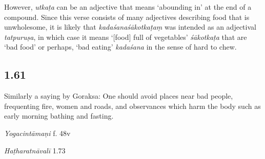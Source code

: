 \begin{ekdosis}
\begin{philcomm}[hp01_060]
However, \emph{utkaṭa} can be an adjective that means ‘abounding in’ at the end of a compound. Since this verse consists of many adjectives describing food that is unwholesome, it is likely that \emph{kadaśanaśākotkaṭaṃ} was intended as an adjectival \emph{tatpuruṣa}, in which case it means ‘[food] full of vegetables' \emph{śākotkaṭa} that are `bad food' or perhaps, `bad eating' \emph{kadaśana} in the sense of hard to chew. 
\end{philcomm}

\subsection*{1.61}
\begin{translation}[hp01_061]
Similarly a saying by Goraksa:
One should avoid places near bad people, frequenting fire, women and roads, and observances which harm the body such as early morning bathing and fasting.
\end{translation}




\begin{testimonia}[hp01_061]
\emph{Yogacintāmaṇi} f. 48v

\begin{versinnote}
\end{versinnote}

\emph{Haṭharatnāvalī} 1.73 

\begin{versinnote}
\tl{\var{°prīti°] °prāntaṃ P, prāptaṃ T,t1. kāyakleśādikaṃ ] kāyakleśavidhiṃ P,T.}\\!}
\end{versinnote}


\end{testimonia}
\end{ekdosis}
